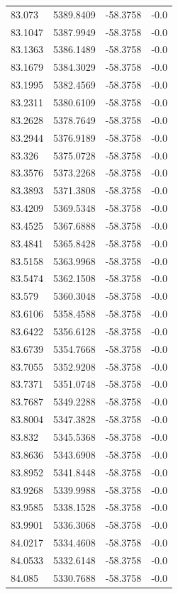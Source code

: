 \begin{table}[H]
\begin{tabular}{llll}
83.073 & 5389.8409 & -58.3758 & -0.0 \\
83.1047 & 5387.9949 & -58.3758 & -0.0 \\
83.1363 & 5386.1489 & -58.3758 & -0.0 \\
83.1679 & 5384.3029 & -58.3758 & -0.0 \\
83.1995 & 5382.4569 & -58.3758 & -0.0 \\
83.2311 & 5380.6109 & -58.3758 & -0.0 \\
83.2628 & 5378.7649 & -58.3758 & -0.0 \\
83.2944 & 5376.9189 & -58.3758 & -0.0 \\
83.326 & 5375.0728 & -58.3758 & -0.0 \\
83.3576 & 5373.2268 & -58.3758 & -0.0 \\
83.3893 & 5371.3808 & -58.3758 & -0.0 \\
83.4209 & 5369.5348 & -58.3758 & -0.0 \\
83.4525 & 5367.6888 & -58.3758 & -0.0 \\
83.4841 & 5365.8428 & -58.3758 & -0.0 \\
83.5158 & 5363.9968 & -58.3758 & -0.0 \\
83.5474 & 5362.1508 & -58.3758 & -0.0 \\
83.579 & 5360.3048 & -58.3758 & -0.0 \\
83.6106 & 5358.4588 & -58.3758 & -0.0 \\
83.6422 & 5356.6128 & -58.3758 & -0.0 \\
83.6739 & 5354.7668 & -58.3758 & -0.0 \\
83.7055 & 5352.9208 & -58.3758 & -0.0 \\
83.7371 & 5351.0748 & -58.3758 & -0.0 \\
83.7687 & 5349.2288 & -58.3758 & -0.0 \\
83.8004 & 5347.3828 & -58.3758 & -0.0 \\
83.832 & 5345.5368 & -58.3758 & -0.0 \\
83.8636 & 5343.6908 & -58.3758 & -0.0 \\
83.8952 & 5341.8448 & -58.3758 & -0.0 \\
83.9268 & 5339.9988 & -58.3758 & -0.0 \\
83.9585 & 5338.1528 & -58.3758 & -0.0 \\
83.9901 & 5336.3068 & -58.3758 & -0.0 \\
84.0217 & 5334.4608 & -58.3758 & -0.0 \\
84.0533 & 5332.6148 & -58.3758 & -0.0 \\
84.085 & 5330.7688 & -58.3758 & -0.0 \\

\end{tabular}
\end{table}
